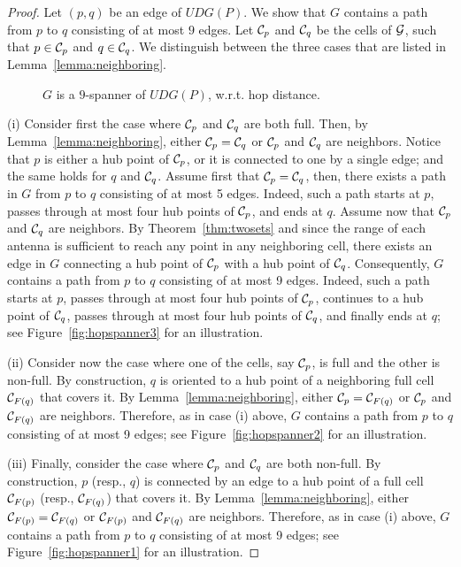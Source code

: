 \documentclass[11pt,letter]{article}
\def\clst#1{{\C_{{{F}}({{#1}})}}}
\def\C{{\cal{C}}}
\def\grid{{\cal{G}}}
\def\graph{{{G}}}
\def\UDG{{U\!DG}}
\begin{document}
\begin{proof}
Let $(p,q)$ be an edge of $\UDG(P)$.
We show that $\graph$ contains a path from $p$ to $q$ consisting of at most $9$ edges.
Let $\C_p$ and $\C_q$ be the cells of $\grid$, such that $p \in \C_p$ and $q \in \C_q$.
We distinguish between the three cases that are listed in Lemma~\ref{lemma:neighboring}.

\begin{figure}[htb]
 \centering
    \caption{$\graph$ is a $9$-spanner of $\UDG(P)$, w.r.t. hop distance.}
\end{figure}

(i) Consider first the case where $\C_p$ and $\C_q$ are both full.
Then, by Lemma~\ref{lemma:neighboring}, either $\C_p = \C_q$ or $\C_p$ and $\C_q$ are neighbors.
Notice that $p$ is either a hub point of $\C_p$, or it is connected to one by a single edge; and the same holds for $q$ and $\C_q$.
Assume first that $\C_p = \C_q$,
then, there exists a path in $\graph$ from $p$ to $q$ consisting of at most 5 edges.
Indeed, such a path starts at $p$, passes through at most four hub points of $\C_p$,
and ends at $q$.
Assume now that $\C_p$ and $\C_q$ are neighbors.
By Theorem~\ref{thm:twosets} and since the range of each antenna is sufficient to reach any point in any neighboring cell,
there exists an edge in $\graph$ connecting a hub point of $\C_p$ with a hub point of $\C_q$.
Consequently, $\graph$ contains a path from $p$ to $q$ consisting of at most 9 edges.
Indeed, such a path starts at $p$,
passes through at most four hub points of $\C_p$,
continues to a hub point of $\C_q$,
passes through at most four hub points of $\C_q$,
and finally ends at $q$;
see Figure~\ref{fig:hopspanner3} for an illustration.

(ii) Consider now the case where one of the cells, say $\C_p$, is full and the other is non-full.
By construction, $q$ is oriented to a hub point of a neighboring full cell $\clst{q}$ that covers it.
By Lemma~\ref{lemma:neighboring}, either $\C_p = \clst{q}$ or $\C_p$ and $\clst{q}$ are neighbors.
Therefore, as in case (i) above, $\graph$ contains a path from $p$ to $q$ consisting of at most 9 edges;
see Figure~\ref{fig:hopspanner2} for an illustration.

(iii) Finally, consider the case where $\C_p$ and $\C_q$ are both non-full.
By construction, $p$ (resp., $q$) is connected by an edge to a hub point of a full cell $\clst{p}$ (resp., $\clst{q}$) that covers it.
By Lemma~\ref{lemma:neighboring}, either $\clst{p} = \clst{q}$ or $\clst{p}$ and $\clst{q}$ are neighbors.
Therefore, as in case (i) above, $\graph$ contains a path from $p$ to $q$ consisting of at most 9 edges;
see Figure~\ref{fig:hopspanner1} for an illustration.
\end{proof}
\end{document}

